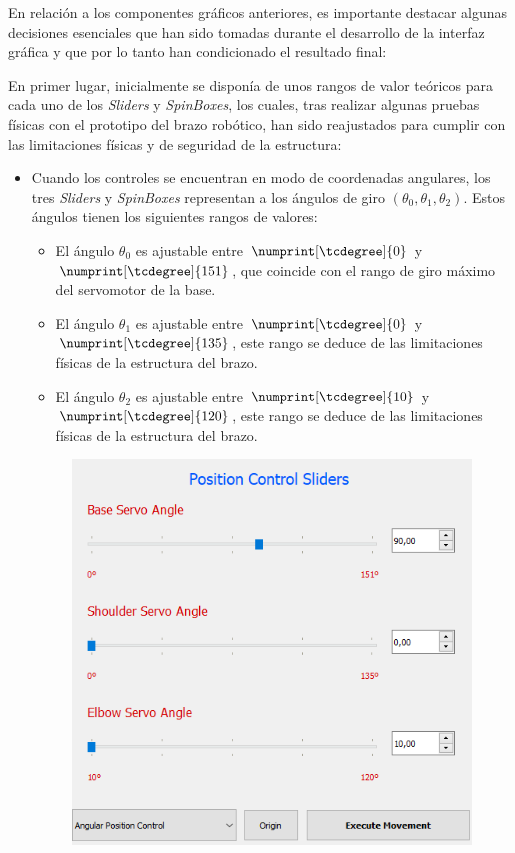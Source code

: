 En relación a los componentes gráficos anteriores, es importante destacar algunas decisiones esenciales que han sido tomadas durante el desarrollo de la interfaz gráfica y que por lo tanto han condicionado el resultado final:

En primer lugar, inicialmente se disponía de unos rangos de valor teóricos para cada uno de los \textit{Sliders} y \textit{SpinBoxes}, los cuales, tras realizar algunas pruebas físicas con el prototipo del brazo robótico, han sido reajustados para cumplir con las limitaciones físicas y de seguridad de la estructura:
    \begin{itemize}
        \item Cuando los controles se encuentran en modo de coordenadas angulares, los tres \textit{Sliders} y \textit{SpinBoxes} representan a los ángulos de giro $(\theta_{0}, \theta_{1}, \theta_{2})$. Estos ángulos tienen los siguientes rangos de valores:
        \begin{itemize}
            \item El ángulo $\theta_{0}$ es ajustable entre $\numprint[\tcdegree]{0}$ y $\numprint[\tcdegree]{151}$, que coincide con el rango de giro máximo del servomotor de la base.
            \item El ángulo $\theta_{1}$ es ajustable entre $\numprint[\tcdegree]{0}$ y $\numprint[\tcdegree]{135}$, este rango se deduce de las limitaciones físicas de la estructura del brazo.
            \item El ángulo $\theta_{2}$ es ajustable entre $\numprint[\tcdegree]{10}$ y $\numprint[\tcdegree]{120}$, este rango se deduce de las limitaciones físicas de la estructura del brazo.
        \end{itemize}
        \begin{figure}[H]
            \centering
            \includegraphics[width=0.55\linewidth]{pictures/Joints_Gui.PNG}

\end{figure}
\end{itemize}
